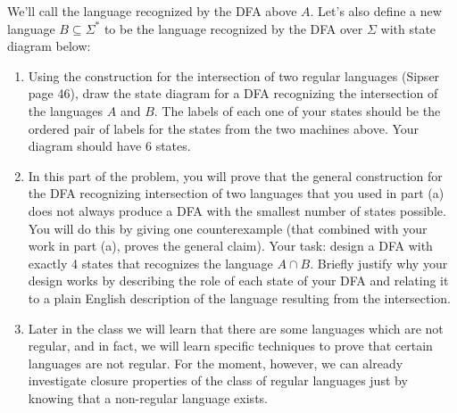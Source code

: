 \begin{enumerate}
\begin{center}
\end{center}
We'll call the language recognized by the DFA above $A$.
Let's also define a new language $B \subseteq \Sigma^*$ to be 
the language recognized by the DFA 
over $\Sigma$ with state diagram below:
\begin{center}
\end{center}

\begin{enumerate}
    \item\gradeCorrect Using the construction for the intersection of two regular languages (Sipser page 46), 
    draw the state diagram for a DFA recognizing the intersection of the languages $A$ and $B$. The labels of 
    each one of your states should be the ordered pair of labels for the states from the two machines above. 
    Your diagram should have $6$ states.
    \item\gradeComplete In this part of the problem, you will prove that the general construction for the DFA 
    recognizing intersection of two languages that 
    you used in part (a) does not always produce a DFA
    with the smallest number of states possible. 
    You will do this by giving one counterexample (that combined with your work in part (a), 
    proves the general claim). Your task: design a DFA with exactly 4 states that recognizes 
    the language $A \cap B$. Briefly justify why your design works by describing the role of each state
    of your DFA and relating it to a plain English description of the language resulting from the intersection.
    \item\gradeCorrect  Later in the class we will learn that there are some languages which are not regular, 
    and in fact, we will learn specific techniques to prove that certain languages are not regular. 
    For the moment, however, we can already investigate closure properties of the class of regular 
    languages just by knowing that a non-regular language exists. 


\end{enumerate}
\end{enumerate}
